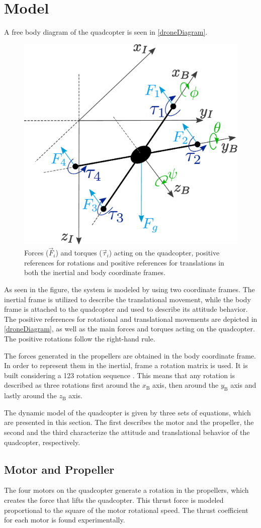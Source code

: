 \section{Model}\label{sec:model}
A free body diagram of the quadcopter is seen in \autoref{droneDiagram}. 
\begin{figure}[H]
	\centering
	\includegraphics[width=.4\textwidth]{figures/droneDiagram}
	\caption{Forces ($\vec{F}_i$) and torques ($\vec{\tau}_i$) acting on the quadcopter, positive references for rotations and positive references for translations in both the inertial and body coordinate frames.}
	\label{droneDiagram}
\end{figure}
%
As seen in the figure, the system is modeled by using two coordinate frames. The inertial frame is utilized to describe the translational movement, while the body frame is attached to the quadcopter and used to describe its attitude behavior. The positive references for rotational and translational movements are depicted in \autoref{droneDiagram}, as well as the main forces and torques acting on the quadcopter. The positive rotations follow the right-hand rule.

The forces generated in the propellers are obtained in the body coordinate frame. In order to represent them in the inertial, frame a rotation matrix is used. It is built considering a 123 rotation sequence \cite{rotationmatrix}. This means that any rotation is described as three rotations first around the $x_\mathrm{B}$ axis, then around the $y_\mathrm{B}$ axis and lastly around the $z_\mathrm{B}$ axis. 

The dynamic model of the quadcopter is given by three sets of equations, which are presented in this section. The first describes the motor and the propeller, the second and the third characterize the attitude and translational behavior of the quadcopter, respectively.

\subsection{Motor and Propeller}
The four motors on the quadcopter generate a rotation in the propellers, which creates the force that lifts the quadcopter. This thrust force is modeled proportional to the square of the motor rotational speed. The thrust coefficient for each motor is found experimentally.
 
